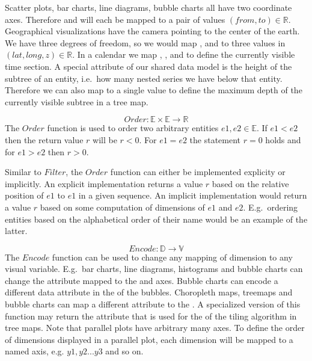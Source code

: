   Scatter plots, bar charts, line diagrams, bubble charts all have two coordinate axes.
  Therefore  and  will each be mapped to a pair of values $(from,to) \in \mathbb{R}$.
  Geographical visualizations have the camera pointing to the center of the earth.
  We have three degrees of freedom, so we would map ,  and  to three values in $(lat,long,z) \in \mathbb{R}$.
  In a calendar we map , ,  and  to define the currently visible time section.
  A special attribute of our shared data model is the height of the subtree of an entity, i.e.\ how many nested series we have below that entity.
  Therefore we can also map  to a single value to define the maximum depth of the currently visible subtree in a tree map.

\begin{equation} Order: \mathbb{E} \times \mathbb{E} \rightarrow \mathbb{R} \end{equation}
  The $Order$ function is used to order two arbitrary entities $e1, e2 \in \mathbb{E}$.
  If $e1 < e2$ then the return value $r$ will be $ r < 0 $.
  For $e1 = e2$ the statement $r = 0$ holds and for $e1 > e2$ then $r > 0$.

  Similar to $Filter$, the $Order$ function can either be implemented explicity or implicitly.
  An explicit implementation returns a value $r$ based on the relative position of $e1$ to $e1$ in a given sequence.
  An implicit implementation would return a value $r$ based on some computation of dimensions of $e1$ and $e2$.
  E.g.\ ordering entities based on the alphabetical order of their name would be an example of the latter.

\begin{equation} Encode: \mathbb{D} \rightarrow \mathbb{V} \end{equation}
  The $Encode$ function can be used to change any mapping of dimension to any visual variable.
  E.g.\ bar charts, line diagrams, histograms and bubble charts can change the attribute mapped to the  and  axes.
  Bubble charts can encode a different data attribute in the  of the bubbles.
  Choropleth maps, treemaps and bubble charts can map a different attribute to the .
  A specialized version of this function may return the attribute that is used for the  of the tiling algorithm in tree maps.
  Note that parallel plots have arbitrary many  axes.
  To define the order of dimensions displayed in a parallel plot, each dimension will be mapped to a named  axis, e.g. $y1, y2 ... y3$ and so on.

